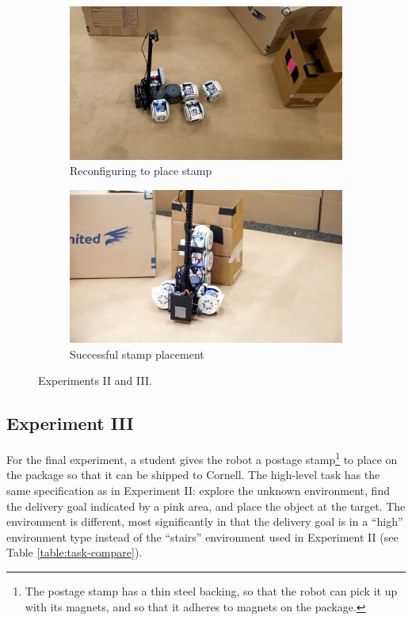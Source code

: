 \documentclass[journal]{IEEEtran}
\begin{document}
\begin{figure}[t]
    \begin{subfigure}[t]{0.24\textwidth}
        \includegraphics[width=\textwidth]{images/stamp_reconfig.jpg}
        \caption{Reconfiguring to place stamp}
    \end{subfigure}
    \begin{subfigure}[t]{0.24\textwidth}
        \includegraphics[width=\textwidth]{images/stamp_placing.jpg}
        \caption{Successful stamp placement}
    \end{subfigure}
      \caption{Experiments II and III.}
      \label{fig:exps}
   \end{figure}

\subsection{Experiment III}

For the final experiment, a student gives the robot a postage stamp\footnote{The postage stamp has a thin steel backing, so that the robot can pick it up with its magnets, and so that it adheres to magnets on the package.} to place on the package so that it can be shipped to Cornell. The high-level task has the same specification as in Experiment II: explore the unknown environment, find the delivery goal indicated by a pink area, and place the object at the target. The environment is different, most significantly in that the delivery goal is in a ``high'' environment type instead of the ``stairs'' environment used in Experiment II (see Table \ref{table:task-compare}).
\end{document}

